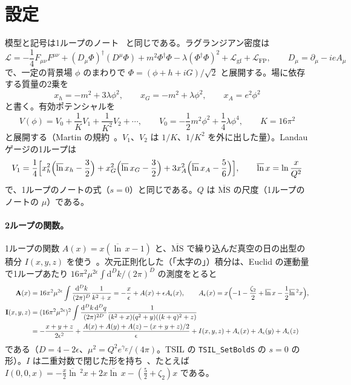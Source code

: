 \documentclass[a4paper,10pt]{ltjsarticle}
\newcommand{\dd}{\mathrm{d}}
\newcommand{\MSbar}{\overline{\mathrm{MS}}}
\newcommand{\lnb}{\overline{\ln}\,}
\newcommand{\Aeps}{A_\epsilon}
\begin{document}
\section{設定}\label{sec:setup}

模型と記号は1ループのノート~\cite{ahnote} と同じである。ラグランジアン密度は
\begin{equation}
\mathcal L=-\frac14F_{\mu\nu}F^{\mu\nu}+(D_\mu\Phi)^\dagger(D^\mu\Phi)+m^2\Phi^\dagger\Phi-\lambda(\Phi^\dagger\Phi)^2+\mathcal L_{\mathrm{gf}}+\mathcal L_{\mathrm{FP}},\qquad
D_\mu=\partial_\mu-ieA_\mu
\label{eq:L}
\end{equation}
で、一定の背景場 $\phi$ のまわりで $\Phi=(\phi+h+iG)/\sqrt2$ と展開する。場に依存する質量の2乗を
\begin{equation}
x_h=-m^2+3\lambda\phi^2,\qquad x_G=-m^2+\lambda\phi^2,\qquad x_A=e^2\phi^2
\label{eq:masses}
\end{equation}
と書く。有効ポテンシャルを
\begin{equation}
V(\phi)=V_0+\frac1KV_1+\frac1{K^2}V_2+\cdots,\qquad V_0=-\frac12m^2\phi^2+\frac14\lambda\phi^4,\qquad K=16\pi^2
\label{eq:V}
\end{equation}
と展開する（Martin の規約~\cite{martin01}。$V_1$、$V_2$ は $1/K$、$1/K^2$ を外に出した量）。Landau ゲージの1ループは
\begin{equation}
V_1=\frac14\Bigl[x_h^2\Bigl(\lnb x_h-\frac32\Bigr)+x_G^2\Bigl(\lnb x_G-\frac32\Bigr)+3x_A^2\Bigl(\lnb x_A-\frac56\Bigr)\Bigr],\qquad \lnb x=\ln\frac x{Q^2}
\label{eq:V1}
\end{equation}
で、1ループのノートの式（$s=0$）と同じである。$Q$ は $\MSbar$ の尺度（1ループのノートの $\mu$）である。

\paragraph{2ループの関数。}1ループの関数 $A(x)=x(\lnb x-1)$ と、$\MSbar$ で繰り込んだ真空の日の出型の積分 $I(x,y,z)$ を使う~\cite{martin01,tsil}。次元正則化した（「太字の」）積分は、Euclid の運動量で1ループあたり $16\pi^2\mu^{2\epsilon}\int\dd^Dk/(2\pi)^D$ の測度をとると
\begin{equation}
\begin{aligned}
\mathbf A(x)&=16\pi^2\mu^{2\epsilon}\int\frac{\dd^Dk}{(2\pi)^D}\frac1{k^2+x}=-\frac x\epsilon+A(x)+\epsilon\Aeps(x),\qquad \Aeps(x)=x\Bigl(-1-\frac{\zeta_2}2+\lnb x-\frac12\lnb^2x\Bigr),\\
\mathbf I(x,y,z)&=(16\pi^2\mu^{2\epsilon})^2\int\frac{\dd^Dk\,\dd^Dq}{(2\pi)^{2D}}\frac1{(k^2+x)(q^2+y)((k+q)^2+z)}\\
&=-\frac{x+y+z}{2\epsilon^2}+\frac{A(x)+A(y)+A(z)-(x+y+z)/2}{\epsilon}+I(x,y,z)+\Aeps(x)+\Aeps(y)+\Aeps(z)
\end{aligned}
\label{eq:bold}
\end{equation}
である（$D=4-2\epsilon$、$\mu^2=Q^2e^{\gamma_E}/(4\pi)$。TSIL の \texttt{TSIL\_SetBoldS} の $s=0$ の形）。$I$ は二重対数で閉じた形を持ち~\cite{martin01}、たとえば $I(0,0,x)=-\frac x2\lnb^2x+2x\lnb x-(\frac52+\zeta_2)x$ である。
\end{document}
